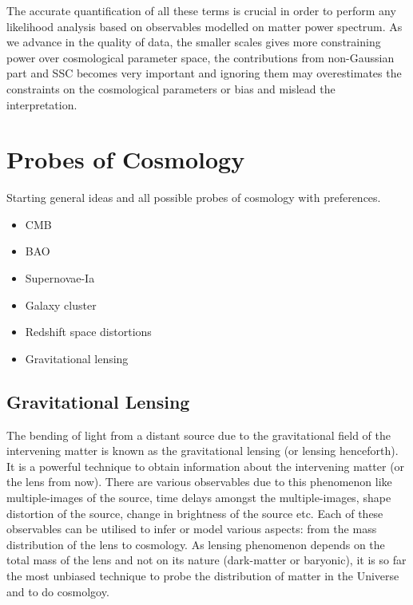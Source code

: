 The accurate quantification of all these terms is crucial in order to perform any
likelihood analysis based on observables modelled on matter power spectrum. As we
advance in the quality of data, the smaller scales gives more constraining power 
over cosmological parameter space, the contributions from non-Gaussian part and SSC
becomes very important and ignoring them may overestimates the constraints on the 
cosmological parameters or bias and mislead the interpretation. 





\clearpage
\section{Probes of Cosmology}

Starting general ideas and all possible probes of cosmology with preferences.
\begin{itemize}
	\item CMB
	\item BAO
	\item Supernovae-Ia
	\item Galaxy cluster
	\item Redshift space distortions
	\item Gravitational lensing
\end{itemize}



\subsection{Gravitational Lensing}
The bending of light from a distant source due to the gravitational field of the
intervening matter is known as
the gravitational lensing (or lensing henceforth). It is a powerful technique to 
obtain information about the intervening matter (or the lens from now). There are
various observables due to this phenomenon like multiple-images of the source, time 
delays amongst the multiple-images, shape distortion of the source, change in brightness
of the source etc. Each of these observables can be utilised to infer or model various
aspects: from the mass distribution of the lens to cosmology. As lensing phenomenon depends 
on the total mass of the lens and not on its nature (dark-matter or baryonic), it is
so far the most unbiased technique to probe the distribution of matter in the Universe
and to do cosmolgoy.

